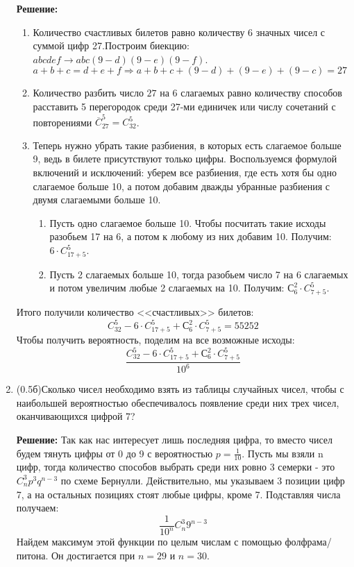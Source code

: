 \documentclass[a4paper, 14pt]{extarticle}
\begin{document}
\begin{enumerate}
	
\textbf{Решение:} 
\begin{enumerate}
    \item Количество счастливых билетов равно количеству 6 значных чисел с суммой цифр 27.\newline Построим биекцию: $abcdef \to abc(9-d)(9-e)(9-f)$. \newline$a+b+c = d+e+f \Rightarrow a+b+c+(9-d) + (9-e) + (9 - c) = 27$
    \item Количество разбить число $27$ на $6$ слагаемых равно количеству способов расставить 5 перегородок среди 27-ми единичек или числу сочетаний с повторениями $\overline C_{27}^{5} =C_{32}^{5}$.
    \item Теперь нужно убрать такие разбиения, в которых есть слагаемое больше 9, ведь в билете присутствуют только цифры. Воспользуемся формулой включений и исключений: уберем все разбиения, где есть хотя бы одно слагаемое больше 10, а потом добавим дважды убранные разбиения с двумя слагаемыми больше 10. 
    \begin{enumerate}
        \item Пусть одно слагаемое больше 10. Чтобы посчитать такие исходы разобьем 17 на 6, а потом к любому из них добавим 10. Получим: $6\cdot C_{17+5}^{5}$.
        \item Пусть 2 слагаемых больше 10, тогда разобьем число 7 на 6 слагаемых и потом увеличим любые 2 слагаемых на 10. Получим: $С_6^2 \cdot C_{7+5}^{5}$.
    \end{enumerate}
\end{enumerate}
Итого получили количество <<счастливых>> билетов:$$C_{32}^{5} - 6\cdot C_{17+5}^{5} + С_6^2 \cdot C_{7+5}^{5} = 55252$$
Чтобы получить вероятность, поделим на все возможные исходы:
$$\frac{C_{32}^{5} - 6\cdot C_{17+5}^{5} + С_6^2 \cdot C_{7+5}^{5}}{10^6}$$
	
	
\item (0.5б)Сколько чисел необходимо взять из таблицы 
	случайных чисел, чтобы с наибольшей вероятностью обеспечивалось
	появление среди них трех чисел, оканчивающихся цифрой 7?
	
\textbf{Решение:}
Так как нас интересует лишь последняя цифра, то вместо
чисел будем тянуть цифры от 0 до 9 с вероятностью $p = \frac{1}{10}$. Пусть мы взяли n цифр, тогда количество способов выбрать среди них ровно 3 семерки - это $C_n^3 p^3 q^{n-3}$ по схеме Бернулли. Действительно, мы указываем 3 позиции цифр 7, а на остальных позициях стоят любые цифры, кроме 7. Подставляя числа получаем: $$\frac{1}{10^n}C_n^3 9^{n-3}$$ Найдем максимум этой функции по целым числам
с помощью фолфрама/питона. Он достигается при $n = 29$ и $n = 30$.


\end{enumerate}
\end{document}

